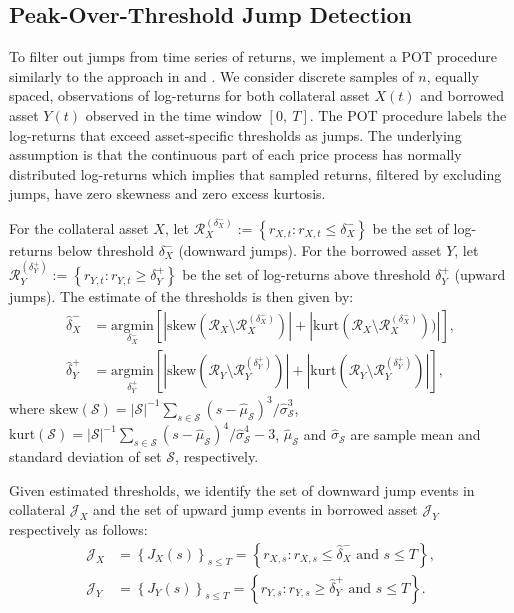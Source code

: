 \documentclass{article}
\theoremstyle{definition}
\begin{document}
\subsection{Peak-Over-Threshold Jump Detection}\label{sec:firststage}

To filter out jumps from time series of returns, we implement a POT procedure similarly to the approach in \cite{embrechts2011multivariate} and \cite[Chapter 4]{hainaut2022continuous}. We consider discrete samples of $n$, equally spaced, observations of log-returns for both collateral asset $X(t)$ and borrowed asset $Y(t)$ observed in the time window $[0,\ T]$.
The POT procedure labels the log-returns that exceed asset-specific thresholds as jumps. The underlying assumption is that the continuous part of each price process has normally distributed log-returns which implies that sampled returns, filtered by excluding jumps, have zero skewness and zero excess kurtosis.

For the collateral asset $X$, let $\mathcal{R}_X^{(\delta_X^-)}:=\left\{r_{X,t}: r_{X,t} \leq \delta_X^-\right\}$ be the set of log-returns below threshold $\delta_X^-$ (downward jumps). For the borrowed asset $Y$, let $\mathcal{R}_Y^{(\delta_Y^+)}:=\left\{r_{Y,t}: r_{Y,t} \geq \delta_Y^+\right\}$ be the set of log-returns above threshold $\delta_Y^+$ (upward jumps).
The estimate of the thresholds is then given by:
\begin{align}
 \widehat\delta_X^- &= \underset{\delta_X^-}{\text{argmin}}  \left[
   |\text{skew}(\mathcal{R}_X \setminus \mathcal{R}_X^{(\delta_X^-)})|+|\text{kurt}(\mathcal{R}_X \setminus \mathcal{R}_X^{(\delta_X^-)}))|
   \right], \\
 \widehat\delta_Y^+ &= \underset{\delta_Y^+}{\text{argmin}}  \left[
   |\text{skew}(\mathcal{R}_Y \setminus \mathcal{R}_Y^{(\delta_Y^+)})|+|\text{kurt}(\mathcal{R}_Y \setminus \mathcal{R}_Y^{(\delta_Y^+)})|
   \right],
\end{align}
where $\text{skew}(\mathcal{S}) = |\mathcal{S}|^{-1}\sum_{s \in \mathcal{S}}(s-\hat \mu_\mathcal{S})^3/\hat \sigma_\mathcal{S}^3$, 
      $\text{kurt}(\mathcal{S}) = |\mathcal{S}|^{-1}\sum_{s \in \mathcal{S}}(s-\hat \mu_\mathcal{S})^4/\hat \sigma_\mathcal{S}^4 - 3$, 
     $\hat \mu_\mathcal{S}$ and $\hat \sigma_\mathcal{S}$ are sample mean and standard deviation of set $\mathcal{S}$, respectively.

Given estimated thresholds, we identify the set of downward jump events in collateral $\mathcal{J}_X$ and the set of upward jump events in borrowed asset $\mathcal{J}_Y$ respectively as follows:
\begin{equation}
   \begin{split}
   \mathcal{J}_X &= \left\{J_X(s)\right\}_{s \leq T} = \left\{
     r_{X,s}: r_{X,s} \leq \widehat\delta_X^- \text{ and } s \leq T
     \right\},\\
     \mathcal{J}_Y &= \left\{J_Y(s)\right\}_{s \leq T} = \left\{
       r_{Y,s}: r_{Y,s} \geq \widehat\delta_Y^+ \text{ and } s \leq T
       \right\}.
   \end{split}
\end{equation}
\end{document}
